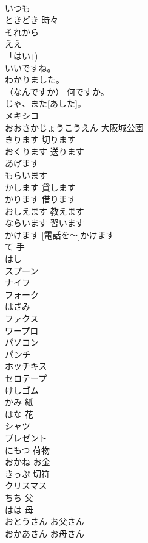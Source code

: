\documentclass[8pt]{extreport}
\begin{document}
\begin{CJK}{UTF8}{min}
\\	いつも			
\\	ときどき	時々	
\\	それから			
\\	ええ			
\\	「はい」)		
\\	いいですね。			
\\	わかりました。			
\\	（なんですか）	何ですか。	
\\	じゃ、また[あした]。			
\\	メキシコ			
\\	おおさかじょうこうえん	大阪城公園	
\\	きります	切ります	
\\	おくります	送ります	
\\	あげます			
\\	もらいます			
\\	かします	貸します	
\\	かります	借ります	
\\	おしえます	教えます	
\\	ならいます	習います	
\\	[でんわを～]かけます	[電話を～]かけます	
\\	て	手	
\\	はし			
\\	スプーン			
\\	ナイフ			
\\	フォーク			
\\	はさみ			
\\	ファクス			
\\	ワープロ			
\\	パソコン			
\\	パンチ			
\\	ホッチキス			
\\	セロテープ			
\\	けしゴム			
\\	かみ	紙	
\\	はな	花	
\\	シャツ			
\\	プレゼント			
\\	にもつ	荷物	
\\	おかね	お金	
\\	きっぷ	切符	
\\	クリスマス			
\\	ちち	父	
\\	はは	母	
\\	おとうさん	お父さん	
\\	おかあさん	お母さん	

\end{CJK}
\end{document}
